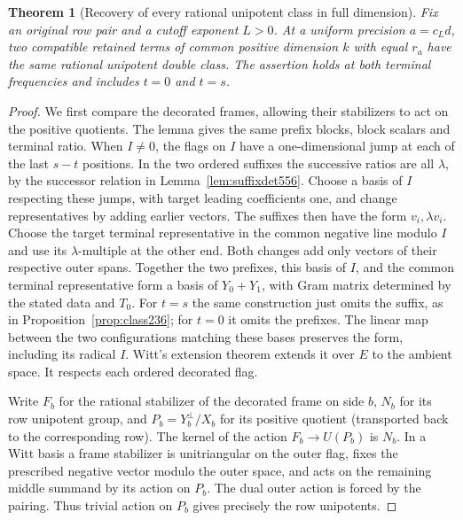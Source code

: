 \documentclass[a4paper,11pt]{article}
\newtheorem{theorem}[proposition]{Theorem}
\theoremstyle{definition}
\theoremstyle{remark}
\numberwithin{equation}{section}
\begin{document}
\begin{theorem}[Recovery of every rational unipotent class in full dimension]
\leavevmode\label{thm:fullrational645}
Fix an original row pair and a cutoff exponent \(L>0\).
At a uniform precision \(a=c_Ld\), two compatible retained
terms of common positive dimension \(k\) with equal
\(r_a\) have the same rational unipotent double class.
The assertion holds at both terminal frequencies and
includes \(t=0\) and \(t=s\).
\end{theorem}
\begin{proof}
We first compare the decorated frames, allowing their
stabilizers to act on the positive quotients. The lemma gives
the same prefix blocks, block scalars and terminal ratio.
When \(I\ne0\), the flags on \(I\) have a one-dimensional jump
at each of the last \(s-t\) positions. In the two ordered
suffixes the successive ratios are all \(\lambda\), by the
successor relation in Lemma~\ref{lem:suffixdet556}. Choose a
basis of \(I\) respecting these jumps, with target leading
coefficients one, and change representatives by adding earlier
vectors. The suffixes then have the form \(v_i,\lambda v_i\).
Choose the target terminal representative in the common
negative line modulo \(I\) and use its \(\lambda\)-multiple
at the other end. Both changes add only vectors of their
respective outer spans. Together the two prefixes, this basis
of \(I\), and the common terminal representative form a basis
of \(Y_0+Y_1\), with Gram matrix determined by the stated
data and \(T_0\). For \(t=s\) the same construction just omits
the suffix, as in Proposition~\ref{prop:class236}; for \(t=0\)
it omits the prefixes. The linear map between the two
configurations matching these bases preserves the form,
including its radical \(I\). Witt's extension theorem
extends it over \(E\) to the ambient space. It respects
each ordered decorated flag.

Write \(F_b\) for the rational stabilizer of the decorated
frame on side \(b\), \(N_b\) for its row unipotent group,
and \(P_b=Y_b^\perp/X_b\) for its positive quotient
(transported back to the corresponding row). The kernel of
the action \(F_b\to U(P_b)\) is \(N_b\). In a Witt basis a
frame stabilizer is unitriangular on the outer flag, fixes
the prescribed negative vector modulo the outer space, and
acts on the remaining middle summand by its action on \(P_b\).
The dual outer action is forced by the pairing. Thus trivial
action on \(P_b\) gives precisely the row unipotents.


\end{proof}
\end{document}
